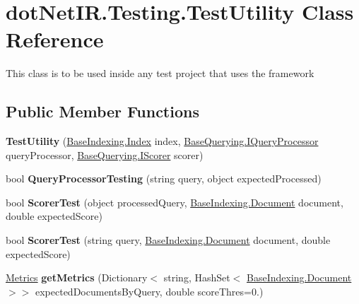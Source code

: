 \hypertarget{classdot_net_i_r_1_1_testing_1_1_test_utility}{}\section{dot\+Net\+I\+R.\+Testing.\+Test\+Utility Class Reference}
\label{classdot_net_i_r_1_1_testing_1_1_test_utility}


This class is to be used inside any test project that uses the framework  


\subsection*{Public Member Functions}
\begin{DoxyCompactItemize}
\item 
\hypertarget{classdot_net_i_r_1_1_testing_1_1_test_utility_a67be64a9e4a0f00ffd7f87be48e72cb4}{}\label{classdot_net_i_r_1_1_testing_1_1_test_utility_a67be64a9e4a0f00ffd7f87be48e72cb4} 
{\bfseries Test\+Utility} (\hyperlink{classdot_net_i_r_1_1_base_indexing_1_1_index}{Base\+Indexing.\+Index} index, \hyperlink{interfacedot_net_i_r_1_1_base_querying_1_1_i_query_processor}{Base\+Querying.\+I\+Query\+Processor} query\+Processor, \hyperlink{interfacedot_net_i_r_1_1_base_querying_1_1_i_scorer}{Base\+Querying.\+I\+Scorer} scorer)
\item 
\hypertarget{classdot_net_i_r_1_1_testing_1_1_test_utility_a16c0d5b4d6f343c55e900f6abc08a779}{}\label{classdot_net_i_r_1_1_testing_1_1_test_utility_a16c0d5b4d6f343c55e900f6abc08a779} 
bool {\bfseries Query\+Processor\+Testing} (string query, object expected\+Processed)
\item 
\hypertarget{classdot_net_i_r_1_1_testing_1_1_test_utility_a303b58a3dd1e42e2d9cb359841ffe67f}{}\label{classdot_net_i_r_1_1_testing_1_1_test_utility_a303b58a3dd1e42e2d9cb359841ffe67f} 
bool {\bfseries Scorer\+Test} (object processed\+Query, \hyperlink{classdot_net_i_r_1_1_base_indexing_1_1_document}{Base\+Indexing.\+Document} document, double expected\+Score)
\item 
\hypertarget{classdot_net_i_r_1_1_testing_1_1_test_utility_af216cee01da720111bd3185b70d108d3}{}\label{classdot_net_i_r_1_1_testing_1_1_test_utility_af216cee01da720111bd3185b70d108d3} 
bool {\bfseries Scorer\+Test} (string query, \hyperlink{classdot_net_i_r_1_1_base_indexing_1_1_document}{Base\+Indexing.\+Document} document, double expected\+Score)
\item 
\hypertarget{classdot_net_i_r_1_1_testing_1_1_test_utility_a314074eda7fdacb67f30f69d9fe5c282}{}\label{classdot_net_i_r_1_1_testing_1_1_test_utility_a314074eda7fdacb67f30f69d9fe5c282} 
\hyperlink{classdot_net_i_r_1_1_testing_1_1_metrics}{Metrics} {\bfseries get\+Metrics} (Dictionary$<$ string, Hash\+Set$<$ \hyperlink{classdot_net_i_r_1_1_base_indexing_1_1_document}{Base\+Indexing.\+Document} $>$$>$ expected\+Documents\+By\+Query, double score\+Thres=0.)
\end{DoxyCompactItemize}
